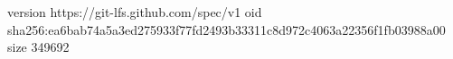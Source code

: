 version https://git-lfs.github.com/spec/v1
oid sha256:ea6bab74a5a3ed275933f77fd2493b33311c8d972c4063a22356f1fb03988a00
size 349692
